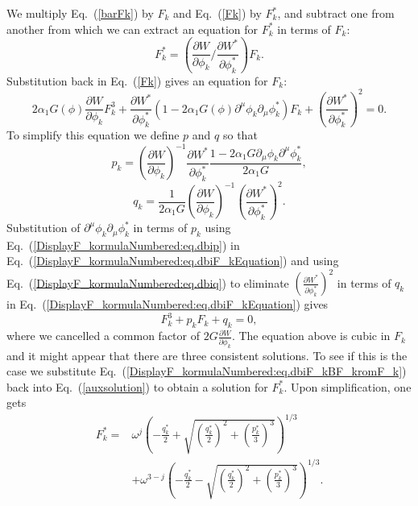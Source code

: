 \documentclass[a4paper,11pt]{article}
\begin{document}
	We multiply Eq.~(\ref{barFk}) by $F_k$ and Eq.~(\ref{Fk}) by $F^*_k$, and subtract one from another from which we can extract an
	equation for $F^*_k$ in terms of $F_k$:
	\begin{equation}\label{DisplayF_kormulaNumbered:eq.dbiF_kBF_kromF_k} 
		{F^*_k}=\left(\frac{\partial W}{\partial \phi_k}/\frac{\partial W^*}{\partial \phi^*_k}\right)F_k.
	\end{equation}
	Substitution back in Eq.~(\ref{Fk}) gives an equation for $F_k$:
	\begin{equation}\label{DisplayF_kormulaNumbered:eq.dbiF_kEquation}
		2\alpha_1G\left(\phi \right)\frac{\partial W}{\partial \phi_k}F_k^3+\frac{\partial W^*}{\partial \phi^*_k}\left(1-2\alpha_1G\left(\phi \right)\partial^\mu \phi_k \partial_\mu \phi^*_k\right)F_k+{\left(\frac{\partial W^*}{\partial \phi^*_k}\right)}^2=0.
	\end{equation}
	To simplify this equation we define $p$ and $q$ so that
	\begin{equation}\label{DisplayF_kormulaNumbered:eq.dbip}
		p_k={\left(\frac{\partial W}{\partial \phi_k}\right)}^{-1}\frac{\partial W^*}{\partial \phi^*_k}\frac{1-2\alpha_1G \partial_\mu \phi_k \partial^\mu \phi^*_k}{2\alpha_1G},
	\end{equation}
	\begin{equation}\label{DisplayF_kormulaNumbered:eq.dbiq}
		q_k=\frac{1}{2\alpha_1G}{\left(\frac{\partial W}{\partial \phi_k}\right)}^{-1}{\left(\frac{\partial W^*}{\partial \phi^*_k}\right)}^2.
	\end{equation}
	Substitution of $\partial^\mu \phi_k \partial_\mu \phi^*_k$ in terms of $p_k$ using Eq.~(\ref{DisplayF_kormulaNumbered:eq.dbip})
	in Eq.~(\ref{DisplayF_kormulaNumbered:eq.dbiF_kEquation})
	and using Eq.~(\ref{DisplayF_kormulaNumbered:eq.dbiq}) to eliminate ${\left(\frac{\partial W^*}{\partial \phi^*_k}\right)}^2$ in terms of
	$q_k$ in  Eq.~(\ref{DisplayF_kormulaNumbered:eq.dbiF_kEquation})
	gives
	\begin{equation}\label{DisplayF_kormulaNumbered:eq.dbiF_kpqEquation}
		F_k^3+p_k F_k+q_k=0,
	\end{equation}
	where we cancelled a common factor of $2G\frac{\partial W}{\partial \phi_k}$. The equation above is cubic in $F_k$ and it might appear that there are three consistent solutions.
	To see if this is the case we substitute Eq.~(\ref{DisplayF_kormulaNumbered:eq.dbiF_kBF_kromF_k}) back into Eq.~(\ref{auxsolution}) to obtain a solution for $F_k^*$. Upon simplification, one gets
	\begin{equation}
	\begin{split}
		F_k^*=& \omega^j {\left(-\frac{q_k^*}{2}+\sqrt{ {\left(\frac{q_k^*}{2}\right)}^2+{\left(\frac{p_k^*}{3}\right)}^3}\right)}^{1/3}\\
		&+ \omega^{3-j}{\left(-\frac{q_k^*}{2}-\sqrt{ {\left(\frac{q_k^*}{2}\right)}^2+{\left(\frac{p_k^*}{3}\right)}^3}\right)}^{1/3}.
	\end{split}
	\label{auxstarsolution}
	\end{equation}
\end{document}
